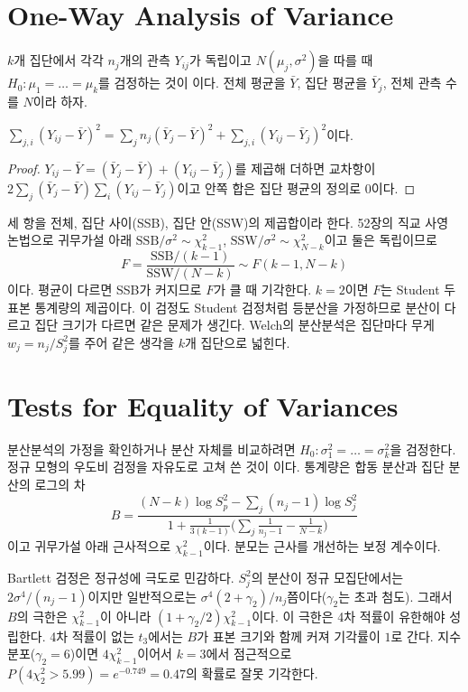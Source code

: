 \section{One-Way Analysis of Variance}
\label{sec:anova}

$k$개 집단에서 각각 $n_j$개의 관측 $Y_{ij}$가 독립이고 $N(\mu_j,\sigma^2)$을 따를 때 $H_0:\mu_1=\dots=\mu_k$를 검정하는 것이 이다. 전체 평균을 $\bar Y$, 집단 평균을 $\bar Y_j$, 전체 관측 수를 $N$이라 하자.

\begin{proposition}
\label{prop:anova-decomposition}
$\sum_{j,i}(Y_{ij}-\bar Y)^2=\sum_jn_j(\bar Y_j-\bar Y)^2+\sum_{j,i}(Y_{ij}-\bar Y_j)^2$이다.
\end{proposition}

\begin{proof}
$Y_{ij}-\bar Y=(\bar Y_j-\bar Y)+(Y_{ij}-\bar Y_j)$를 제곱해 더하면 교차항이 $2\sum_j(\bar Y_j-\bar Y)\sum_i(Y_{ij}-\bar Y_j)$이고 안쪽 합은 집단 평균의 정의로 $0$이다.
\end{proof}

세 항을 전체, 집단 사이(SSB), 집단 안(SSW)의 제곱합이라 한다. 52장의 직교 사영 논법으로 귀무가설 아래 $\mathrm{SSB}/\sigma^2\sim\chi^2_{k-1}$, $\mathrm{SSW}/\sigma^2\sim\chi^2_{N-k}$이고 둘은 독립이므로
\[
F=\frac{\mathrm{SSB}/(k-1)}{\mathrm{SSW}/(N-k)}\sim F(k-1,N-k)
\]
이다. 평균이 다르면 SSB가 커지므로 $F$가 클 때 기각한다. $k=2$이면 $F$는 Student 두 표본 통계량의 제곱이다. 이 검정도 Student 검정처럼 등분산을 가정하므로 분산이 다르고 집단 크기가 다르면 같은 문제가 생긴다. Welch의 분산분석은 집단마다 무게 $w_j=n_j/S_j^2$를 주어 같은 생각을 $k$개 집단으로 넓힌다\cite{welch1951}.

\section{Tests for Equality of Variances}
\label{sec:variance-homogeneity}

분산분석의 가정을 확인하거나 분산 자체를 비교하려면 $H_0:\sigma_1^2=\dots=\sigma_k^2$을 검정한다. 정규 모형의 우도비 검정을 자유도로 고쳐 쓴 것이 이다\cite{bartlett1937}. 통계량은 합동 분산과 집단 분산의 로그의 차
\[
B=\frac{(N-k)\log S_p^2-\sum_j(n_j-1)\log S_j^2}{1+\frac1{3(k-1)}\bigl(\sum_j\frac1{n_j-1}-\frac1{N-k}\bigr)}
\]
이고 귀무가설 아래 근사적으로 $\chi^2_{k-1}$이다. 분모는 근사를 개선하는 보정 계수이다.

Bartlett 검정은 정규성에 극도로 민감하다. $S_j^2$의 분산이 정규 모집단에서는 $2\sigma^4/(n_j-1)$이지만 일반적으로는 $\sigma^4(2+\gamma_2)/n_j$쯤이다($\gamma_2$는 초과 첨도). 그래서 $B$의 극한은 $\chi^2_{k-1}$이 아니라 $(1+\gamma_2/2)\chi^2_{k-1}$이다. 이 극한은 4차 적률이 유한해야 성립한다. 4차 적률이 없는 $t_3$에서는 $B$가 표본 크기와 함께 커져 기각률이 $1$로 간다. 지수 분포($\gamma_2=6$)이면 $4\chi^2_{k-1}$이어서 $k=3$에서 점근적으로 $P(4\chi^2_2>5.99)=e^{-0.749}=0.47$의 확률로 잘못 기각한다.

